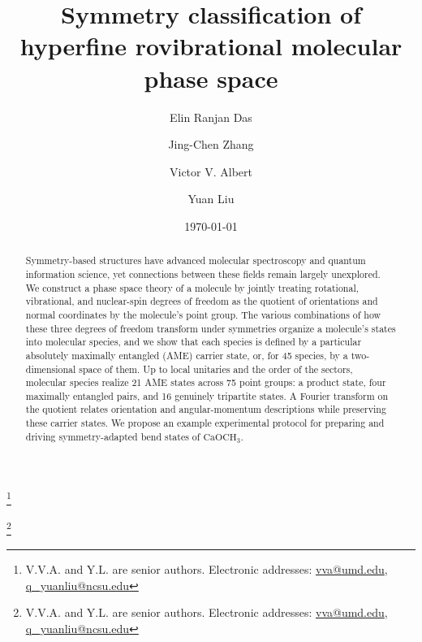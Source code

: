 \documentclass[
  reprint,
  aps,
  prx,
  superscriptaddress,
  amsmath,
  amssymb,
  longbibliography
]{revtex4-2}
\makeatletter
\newcommand{\seniorauthornote}{V.V.A. and Y.L. are senior authors. Electronic addresses: \href{mailto:vva@umd.edu}{vva@umd.edu}, \href{mailto:q\string_yuanliu@ncsu.edu}{q\_yuanliu@ncsu.edu}}
\makeatother
\begin{document}
\title{
Symmetry classification of hyperfine rovibrational molecular phase space
}

\author{Elin Ranjan Das}


\author{Jing-Chen Zhang}


\author{Victor V. Albert}
\thanks{\seniorauthornote}


\author{Yuan Liu}
\thanks{\seniorauthornote}



\date{\today}










\begin{abstract}

Symmetry-based structures have advanced molecular spectroscopy and quantum information science, yet connections between these fields remain largely unexplored.
We construct a phase space theory of a molecule by jointly treating rotational, vibrational, and nuclear-spin degrees of freedom as the quotient of orientations and normal coordinates by the molecule's point group.
The various combinations of how these three degrees of freedom transform under symmetries organize a molecule's states into molecular species, and we show that each species is defined by a particular absolutely maximally entangled (AME) carrier state, or, for 45 species, by a two-dimensional space of them. 
Up to local unitaries and the order of the sectors, molecular species realize 21 AME states across 75 point groups: a product state, four maximally entangled pairs, and 16 genuinely tripartite states.
A Fourier transform on the quotient relates orientation and angular-momentum descriptions while preserving these carrier states. 
We propose an example experimental protocol for preparing and driving symmetry-adapted bend states of $\mathrm{CaOCH_3}$.


\end{abstract}
\end{document}
